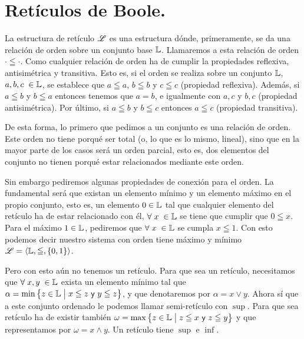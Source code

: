 \documentclass[final,12pt,a4paper,twoside,fleqn]{extbook}
\newcommand {\setCompr}[2]{
	\ensuremath{
		\left\lbrace{ 
			#1 {\;\big{\vert}\;} #2
        }\right\rbrace
    }
}
\theoremstyle{definition}
\theoremstyle{remark}
\begin{document}
\chapter{Retículos de Boole.}



	La estructura de retículo \(\mathscr{L}\) es una estructura dónde,
primeramente, se da una relación de orden sobre un conjunto base \(\mathbb{L}\).
Llamaremos a esta relación de orden \(\cdot \leqq \cdot\). Como cualquier
relación de orden ha de cumplir la propiedades reflexiva, antisimétrica y
transitiva. Esto es, si el orden se realiza sobre un conjunto \(\mathbb{L}\),
\(a,b,c\;\in\mathbb{L}\), se establece que \(a\leqq a\), \(b\leqq b\) y \(c \leqq
c\) (propiedad \textsf{reflexiva}). Además, si \(a \leqq b\) y \(b \leqq a\)
entonces tenemos que \(a = b\), e igualmente con \(a,c\) y \(b,c\) (propiedad
\textsf{antisimétrica}). Por último, si \(a\leqq b\) y \(b \leqq c\) entonces
\(a \leqq c\) (propiedad \textsf{transitiva}).



	De esta forma, lo primero que pedimos a un conjunto es una relación de
orden. Este orden no tiene porqué ser total (o, lo que es lo mismo, lineal),
sino que en la mayor parte de los casos será un orden parcial, esto es, dos
elementos del conjunto no tienen porqué estar relacionados mediante este
orden.



	Sin embargo pediremos algunas propiedades de conexión para el orden. La
fundamental será que existan un elemento mínimo y un elemento máximo en el
propio conjunto, esto es, un elemento \(0 \in \mathbb{L}\) tal que cualquier
elemento del retículo ha de estar relacionado con él, \(\forall \;x\; \in
\mathbb{L}\) se tiene que cumplir que \(0\leqq x\). Para el máximo \(1\in\mathbb{L}\),
pediremos que \(\forall \; x \; \in \mathbb{L}\) se cumpla \( x \leqq 1 \). Con
esto podemos decir nuestro sistema con orden tiene máximo y mínimo
\(\mathscr{L} =\left\langle \mathbb{L} , \leqq , \left\lbrace 0,1 \right\rbrace
\right\rangle\).



	Pero con esto aún no tenemos un retículo. Para que sea un retículo,
necesitamos que \(\forall \;x,y\; \in \mathbb{L}\) exista un elemento mínimo tal
que \(\alpha  = \min\setCompr{z\in\setL}{x \leqq z \textsf{ y } y \leqq z}\),
y que denotaremos por \(\alpha = x \vee y\). Ahora sí que a este conjunto
ordenado le podemos llamar semi-retículo con \(\sup\). Para que sea retículo
ha de existir también \(\omega = \max\setCompr{z\in\setL}{z \leqq x \textsf{
y } z \leqq y}\) y que representamos por \(\omega = x \wedge y\). Un retículo
tiene \(\sup\) e \(\inf\).
\end{document}
